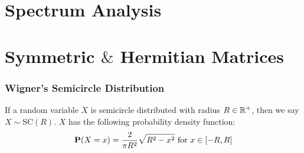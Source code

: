 

\section{Spectrum Analysis}









\section{Symmetric $\&$ Hermitian Matrices}

\begin{frame} \frametitle{Wigner's Semicircle Distribution}

\begin{alertblock}{}
If a random variable $X$ is semicircle distributed with radius $R \in \mathbb{R}^+$, then we say $X \sim \text{SC}(R)$. $X$ has the following probability density function:
$$\textbf{P}(X = x) = \frac{2}{\pi R^2} \sqrt{R^2 - x^2} \text{ for } x \in [-R, R]$$
\end{alertblock}

\end{frame}








